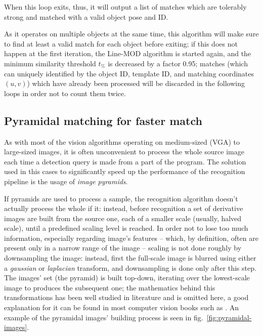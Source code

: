 When this loop exits, thus, it will output a list of matches which are
tolerably strong and matched with a valid object pose and ID.

As it operates on multiple objects at the same time, this algorithm
will make sure to find at least a valid match for each object before
exiting; if this does not happen at the first iteration, the
Line-MOD algorithm is started again, and the minimum similarity
threshold $t_\%$ is decreased by a factor 0.95; matches (which can
uniquely identified by the object ID, template ID, and matching
coordinates $(u,v)$) which have already been processed will be
discarded in the following loops in order not to count them twice.

\subsection{Pyramidal matching for faster match}
As with most of the vision algorithms operating on medium-sized (VGA)
to large-sized  images, it is often unconvenient to process the
whole source image each time a detection query is made from a part of
the program. The solution used in this cases to significantly speed up
the performance of the recognition pipeline is the usage of
\emph{image pyramids}.

If pyramids are used to process a sample, the recognition algorithm
doesn't actually process the whole if it: instead, before recognition
a set of derivative images are built from the source one, each of a
smaller scale (usually, halved scale), until a predefined scaling
level is reached. In order not to lose too much information,
especially regarding image's features -- which, by definition, often
are present only in a narrow range of the image -- scaling
is not done roughly by downsampling the image: instead, first the
full-scale image is blurred using either a \emph{gaussian} or
\emph{laplacian} transform, and downsampling is done only after this
step. The images' set (the pyramid) is built top-down, iterating over
the lowest-scale image to produces the subsequent one; the mathematics
behind this transformations has been well studied in literature and is
omitted here, a good explanation for it can be found in most computer
vision books such as \cite{computervision}. An example of the pyramidal
images' building process is seen in fig.~\ref{fig:pyramidal-images}.

